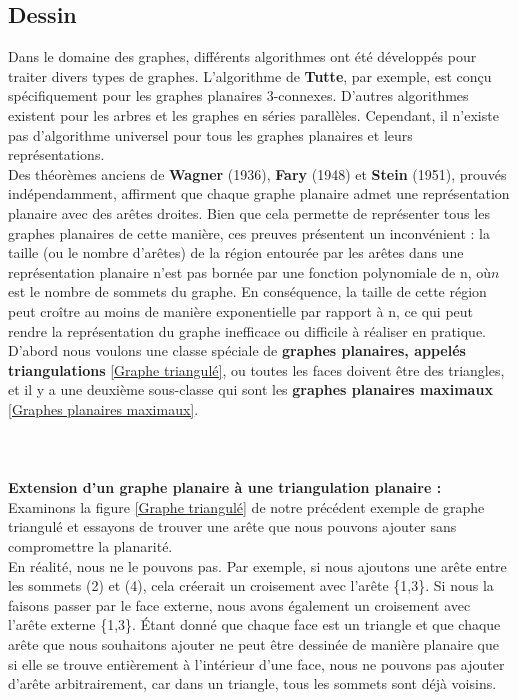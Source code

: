 \documentclass[hidelinks,letterpaper,12pt]{article}
\begin{document}
\subsection{Dessin}
\label{Dessin}
Dans le domaine des graphes, différents algorithmes ont été développés pour traiter divers types de graphes. L'algorithme de \textbf{Tutte}, par exemple, est conçu spécifiquement pour les graphes planaires 3-connexes. D'autres algorithmes existent pour les arbres et les graphes en séries parallèles. Cependant, il n'existe pas d'algorithme universel pour tous les graphes planaires et leurs représentations.
\\
Des théorèmes anciens de \textbf{Wagner} (1936), \textbf{Fary} (1948) et \textbf{Stein} (1951), prouvés indépendamment, affirment que chaque graphe planaire admet une représentation planaire avec des arêtes droites. Bien que cela permette de représenter tous les graphes planaires de cette manière, ces preuves présentent un inconvénient : la taille (ou le nombre d'arêtes) de la région entourée par les arêtes dans une représentation planaire n'est pas bornée par une fonction polynomiale de n, où$n$est le nombre de sommets du graphe. En conséquence, la taille de cette région peut croître au moins de manière exponentielle par rapport à n, ce qui peut rendre la représentation du graphe inefficace ou difficile à réaliser en pratique.
\bigbreak
D’abord nous voulons une classe spéciale de \textbf{graphes planaires, appelés triangulations} \ref{Graphe triangulé}, ou toutes les faces doivent être des triangles, et il y a une deuxième sous-classe qui sont les \textbf{graphes planaires maximaux} \ref{Graphes planaires maximaux}.	
\\	\\ \\ \\ 
\textbf{Extension d'un graphe planaire à une triangulation planaire :}
\bigbreak
Examinons la figure \ref{Graphe triangulé} de notre précédent exemple de graphe triangulé et essayons de trouver une arête que nous pouvons ajouter sans compromettre la planarité.
\\
En réalité, nous ne le pouvons pas. Par exemple, si nous ajoutons une arête entre les sommets (2) et (4), cela créerait un croisement avec l'arête \{1,3\}. Si nous la faisons passer par le face externe, nous avons également un croisement avec l'arête externe \{1,3\}. Étant donné que chaque face est un triangle et que chaque arête que nous souhaitons ajouter ne peut être dessinée de manière planaire que si elle se trouve entièrement à l'intérieur d'une face, nous ne pouvons pas ajouter d'arête arbitrairement, car dans un triangle, tous les sommets sont déjà voisins.
\end{document}
